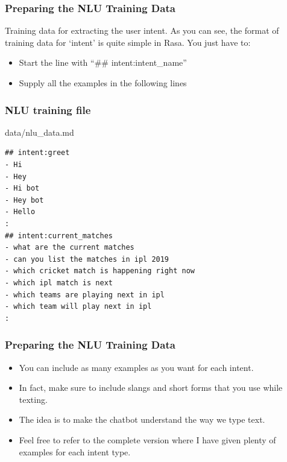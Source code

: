 
 \begin{frame}[fragile]\frametitle{Preparing the NLU Training Data}
Training data for extracting the user intent. As you can see, the format of training data for `intent' is quite simple in Rasa. You just have to:
\begin{itemize}
\item Start the line with ``\#\# intent:intent\_name''
\item Supply all the examples in the following lines
\end{itemize}

\end{frame}

 \begin{frame}[fragile]\frametitle{NLU training file}
data/nlu\_data.md

\begin{lstlisting}
## intent:greet
- Hi
- Hey
- Hi bot
- Hey bot
- Hello
:
## intent:current_matches
- what are the current matches
- can you list the matches in ipl 2019
- which cricket match is happening right now
- which ipl match is next
- which teams are playing next in ipl
- which team will play next in ipl
:
\end{lstlisting}
\end{frame}

 \begin{frame}[fragile]\frametitle{Preparing the NLU Training Data}

\begin{itemize}
\item You can include as many examples as you want for each intent. 
\item In fact, make sure to include slangs and short forms that you use while texting. 
\item The idea is to make the chatbot understand the way we type text. 
\item Feel free to refer to the complete version where I have given plenty of examples for each intent type.
\end{itemize}

\end{frame}

